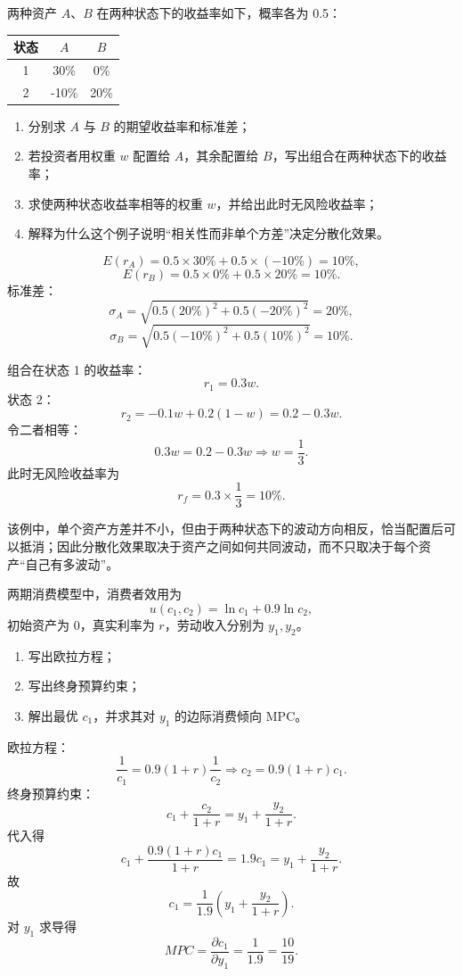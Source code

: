 \begin{question}
两种资产 $A$、$B$ 在两种状态下的收益率如下，概率各为 0.5：
\begin{center}
\begin{tabular}{c|cc}
状态 & $A$ & $B$\\\hline
1 & 30\% & 0\%\\
2 & -10\% & 20\%
\end{tabular}
\end{center}
\begin{enumerate}[label=(\alph*),leftmargin=2.5em]
  \item 分别求 $A$ 与 $B$ 的期望收益率和标准差；
  \item 若投资者用权重 $w$ 配置给 $A$，其余配置给 $B$，写出组合在两种状态下的收益率；
  \item 求使两种状态收益率相等的权重 $w$，并给出此时无风险收益率；
  \item 解释为什么这个例子说明“相关性而非单个方差”决定分散化效果。
\end{enumerate}
\begin{solution}
\[
E(r_A)=0.5\times30\%+0.5\times(-10\%)=10\%,
\]
\[
E(r_B)=0.5\times0\%+0.5\times20\%=10\%.
\]
标准差：
\[
\sigma_A=\sqrt{0.5(20\%)^2+0.5(-20\%)^2}=20\%,
\]
\[
\sigma_B=\sqrt{0.5(-10\%)^2+0.5(10\%)^2}=10\%.
\]

组合在状态 1 的收益率：
\[
r_1=0.3w.
\]
状态 2：
\[
r_2=-0.1w+0.2(1-w)=0.2-0.3w.
\]
令二者相等：
\[
0.3w=0.2-0.3w\Rightarrow w=\frac13.
\]
此时无风险收益率为
\[
r_f=0.3\times\frac13=10\%.
\]

该例中，单个资产方差并不小，但由于两种状态下的波动方向相反，恰当配置后可以抵消；因此分散化效果取决于资产之间如何共同波动，而不只取决于每个资产“自己有多波动”。
\end{solution}
\end{question}

\begin{question}
两期消费模型中，消费者效用为
\[
u(c_1,c_2)=\ln c_1+0.9\ln c_2,
\]
初始资产为 0，真实利率为 $r$，劳动收入分别为 $y_1,y_2$。
\begin{enumerate}[label=(\alph*),leftmargin=2.5em]
  \item 写出欧拉方程；
  \item 写出终身预算约束；
  \item 解出最优 $c_1$，并求其对 $y_1$ 的边际消费倾向 MPC。
\end{enumerate}
\begin{solution}
欧拉方程：
\[
\frac{1}{c_1}=0.9(1+r)\frac{1}{c_2}
\Rightarrow c_2=0.9(1+r)c_1.
\]
终身预算约束：
\[
c_1+\frac{c_2}{1+r}=y_1+\frac{y_2}{1+r}.
\]
代入得
\[
c_1+\frac{0.9(1+r)c_1}{1+r}=1.9c_1=y_1+\frac{y_2}{1+r}.
\]
故
\[
c_1=\frac{1}{1.9}\left(y_1+\frac{y_2}{1+r}\right).
\]
对 $y_1$ 求导得
\[
MPC=\frac{\partial c_1}{\partial y_1}=\frac{1}{1.9}=\frac{10}{19}.
\]
\end{solution}
\end{question}

